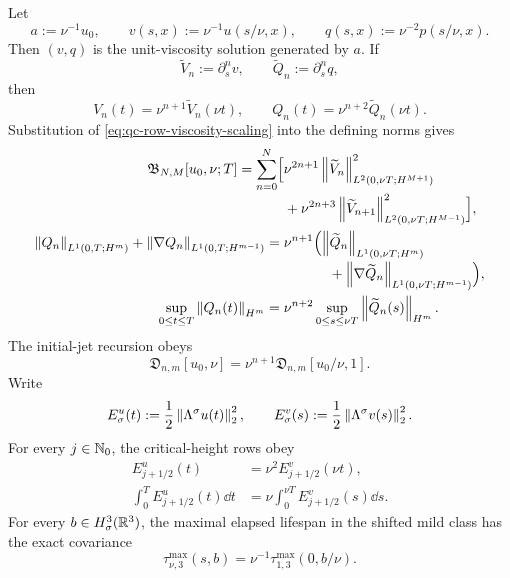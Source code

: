 \begin{proposition}
\label{prop:qc-exact-viscosity-scaling}
Let
\[
 a:=\nu^{-1}u_0,
 \qquad
 v(s,x):=\nu^{-1}u(s/\nu,x),
 \qquad
 q(s,x):=\nu^{-2}p(s/\nu,x).
\]
Then \((v,q)\) is the unit-viscosity solution generated by \(a\).  If
\[
 \widetilde V_n:=\partial_s^nv,
 \qquad
 \widetilde Q_n:=\partial_s^nq,
\]
then
\begin{equation}
 V_n(t)=\nu^{n+1}\widetilde V_n(\nu t),
 \qquad
 Q_n(t)=\nu^{n+2}\widetilde Q_n(\nu t).
 \label{eq:qc-row-viscosity-scaling}
\end{equation}
Substitution of \eqref{eq:qc-row-viscosity-scaling} into the defining norms gives
\begin{align}
 \mathfrak B_{N,M}[u_0,\nu;T]
 =\sum_{n=0}^{N}\Bigl[{}
 &\nu^{2n+1}
 \left\lVert \widetilde V_n\right\rVert_{L^2(0,\nu T;H^{M+1})}^2
 \notag\\[-2pt]
 &+\nu^{2n+3}
 \left\lVert \widetilde V_{n+1}\right\rVert_{L^2(0,\nu T;H^{M-1})}^2
 \Bigr],
 \label{eq:qc-rectangle-viscosity-scaling}\\
 \left\lVert Q_n\right\rVert_{L^1(0,T;H^m)}
 +\left\lVert \nabla Q_n\right\rVert_{L^1(0,T;H^{m-1})}
 ={}&\nu^{n+1}\Bigl(
 \left\lVert \widetilde Q_n\right\rVert_{L^1(0,\nu T;H^m)}
 \notag\\[-2pt]
 &\hspace{32pt}+
 \left\lVert \nabla\widetilde Q_n\right\rVert_{L^1(0,\nu T;H^{m-1})}
 \Bigr),
 \label{eq:qc-pressure-viscosity-scaling}\\
 \sup_{0\le t\le T}\left\lVert Q_n(t)\right\rVert_{H^m}
 ={}&\nu^{n+2}
 \sup_{0\le s\le\nu T}\left\lVert \widetilde Q_n(s)\right\rVert_{H^m}.
 \label{eq:qc-pressure-sup-viscosity-scaling}
\end{align}
The initial-jet recursion obeys
\begin{equation}
 \mathfrak D_{n,m}[u_0,\nu]
 =\nu^{n+1}\mathfrak D_{n,m}[u_0/\nu,1].
 \label{eq:qc-initial-jet-viscosity-scaling}
\end{equation}
Write
\[
 E_\sigma^u(t):=\frac12\left\lVert \Lambda^\sigma u(t)\right\rVert_2^2,
 \qquad
 E_\sigma^v(s):=\frac12\left\lVert \Lambda^\sigma v(s)\right\rVert_2^2.
\]
For every \(j\in\mathbb N_0\), the critical-height rows obey
\begin{align}
 E_{j+1/2}^u(t)
 &=\nu^2E_{j+1/2}^v(\nu t),
 \label{eq:qc-critical-height-viscosity-scaling}\\
 \int_0^T E_{j+1/2}^u(t)\dd t
 &=\nu\int_0^{\nu T}E_{j+1/2}^v(s)\dd s.
 \label{eq:qc-critical-height-mass-viscosity-scaling}
\end{align}
For every \(b\in H^3_\sigma(\mathbb R^3)\), the maximal elapsed lifespan in the
shifted mild class has the exact covariance
\begin{equation}
 \tau_{\nu,3}^{\max}(s,b)
 =\nu^{-1}\tau_{1,3}^{\max}(0,b/\nu).
 \label{eq:qc-maximal-lifespan-viscosity-scaling}
\end{equation}
\end{proposition}

